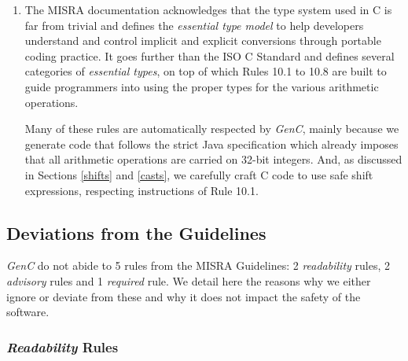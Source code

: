 \documentclass[a4paper,twoside]{article}
\newcommand{\GenC}{\emph{GenC}\xspace}
\begin{document}
\begin{enumerate}
\item The MISRA documentation acknowledges that the type system used in C is far
from trivial and defines the \emph{essential type model} to help developers
understand and control implicit and explicit conversions through portable coding
practice. It goes further than the ISO C Standard and defines several categories
of \emph{essential types}, on top of which Rules 10.1 to 10.8 are built to guide
programmers into using the proper types for the various arithmetic operations.

Many of these rules are automatically respected by \GenC, mainly because we
generate code that follows the strict Java specification which already imposes
that all arithmetic operations are carried on 32-bit integers. And, as discussed
in Sections \ref{shifts} and \ref{casts}, we carefully craft C code to use safe
shift expressions, respecting instructions of Rule 10.1.

\end{enumerate}

\subsection{Deviations from the Guidelines}
\label{unmet_rules}

\GenC do not abide to 5 rules from the MISRA Guidelines: 2 \emph{readability}
rules, 2 \emph{advisory} rules and 1 \emph{required} rule. We detail here the
reasons why we either ignore or deviate from these and why it does not impact
the safety of the software.

\subsubsection*{\emph{Readability} Rules}
\end{document}
